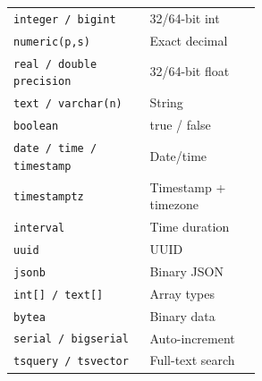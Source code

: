 \documentclass[10pt]{extarticle}
\begin{document}
\newpage


\begin{multicols}{2}

\begin{tabularx}{\linewidth}{@{}>{\raggedright\arraybackslash}p{0.55\linewidth}@{\enspace}Y@{}}
\texttt{integer / bigint}           & 32/64-bit int \\
\texttt{numeric(p,s)}               & Exact decimal \\
\texttt{real / double precision}    & 32/64-bit float \\
\texttt{text / varchar(n)}          & String \\
\texttt{boolean}                     & true / false \\
\texttt{date / time / timestamp}    & Date/time \\
\texttt{timestamptz}                 & Timestamp + timezone \\
\texttt{interval}                    & Time duration \\
\texttt{uuid}                        & UUID \\
\texttt{jsonb}                       & Binary JSON \\
\texttt{int[] / text[]}              & Array types \\
\texttt{bytea}                       & Binary data \\
\texttt{serial / bigserial}         & Auto-increment \\
\texttt{tsquery / tsvector}         & Full-text search \\
\end{tabularx}


\end{multicols}
\end{document}
